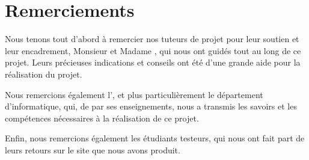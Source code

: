 \chapter*{Remerciements}

Nous tenons tout d'abord à remercier nos tuteurs de projet pour leur soutien et leur encadrement, Monsieur  et Madame , qui nous ont guidés tout au long de ce projet. 
Leurs précieuses indications et conseils ont été d'une grande aide pour la réalisation du projet.
\bigskip

Nous remercions également l'\univ, et plus particulièrement le département d'informatique, qui, de par ses enseignements, nous a transmis les savoirs et les compétences nécessaires à la réalisation de ce projet.
\bigskip

Enfin, nous remercions également les étudiants testeurs, qui nous ont fait part de leurs retours sur le site que nous avons produit.
